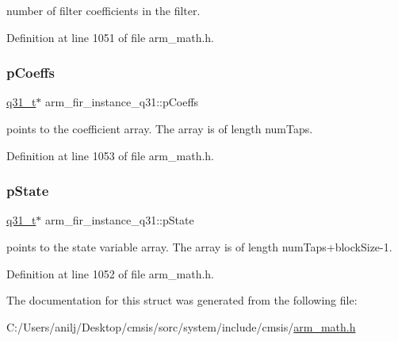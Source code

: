 number of filter coefficients in the filter. 

Definition at line 1051 of file arm\+\_\+math.\+h.

\mbox{\label{structarm__fir__instance__q31_afaae4c884bdf11a4ec2f3b9bb2bb51d0}} 
\subsubsection{\texorpdfstring{p\+Coeffs}{pCoeffs}}
{\footnotesize\ttfamily \hyperlink{arm__math_8h_adc89a3547f5324b7b3b95adec3806bc0}{q31\+\_\+t}$\ast$ arm\+\_\+fir\+\_\+instance\+\_\+q31\+::p\+Coeffs}

points to the coefficient array. The array is of length num\+Taps. 

Definition at line 1053 of file arm\+\_\+math.\+h.

\mbox{\label{structarm__fir__instance__q31_a409f39c93b744784648bdc365541444d}} 
\subsubsection{\texorpdfstring{p\+State}{pState}}
{\footnotesize\ttfamily \hyperlink{arm__math_8h_adc89a3547f5324b7b3b95adec3806bc0}{q31\+\_\+t}$\ast$ arm\+\_\+fir\+\_\+instance\+\_\+q31\+::p\+State}

points to the state variable array. The array is of length num\+Taps+block\+Size-\/1. 

Definition at line 1052 of file arm\+\_\+math.\+h.



The documentation for this struct was generated from the following file\+:\begin{DoxyCompactItemize}
\item 
C\+:/\+Users/anilj/\+Desktop/cmsis/sorc/system/include/cmsis/\hyperlink{arm__math_8h}{arm\+\_\+math.\+h}\end{DoxyCompactItemize}
